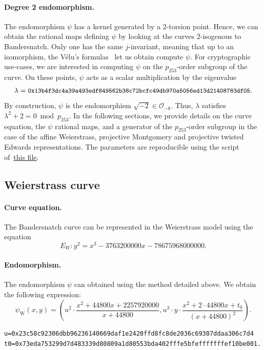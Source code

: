 \documentclass{article}
\theoremstyle{definition}
\begin{document}
\paragraph{Degree 2 endomorphism.}
The endomorphism $\psi$ has a kernel generated by a $2$-torsion
point. Hence, we can obtain the rational maps defining $\psi$ by
looking at the curves $2$-isogenous to Bandersnatch. Only one has the
same $j$-invariant, meaning that up to an isomorphism, the Vélu's
formulas~\cite{velu71} let us obtain compute $\psi$.
For cryptographic use-cases, we are interested in computing $\psi$ on
the $p_{253}$-order subgroup of the curve. On these points, $\psi$
acts as a scalar multiplication by the eigenvalue
$$\lambda = \text{\small{\tt
    0x13b4f3dc4a39a493edf849562b38c72bcfc49db970a5056ed13d21408783df05}}.$$
By construction, $\psi$ is the endomorphism $\sqrt{-2}\in \mathcal
O_{-8}$. Thus, $\lambda$ satisfies
$\lambda^2+2 = 0 \bmod p_{253}$.
In the following sections, we provide details on the curve equation,
the $\psi$ rational maps, and a generator of the $p_{253}$-order
subgroup in the case of the affine Weierstrass, projective Montgomery
and projective twisted Edwards representations.
The parameters are reproducible using the script
of~\href{https://github.com/asanso/Bandersnatch/blob/main/python-ref-impl/get\_params.py}{this
  file}.

\subsection{Weierstrass curve}\label{sec-w-curve}
\paragraph{Curve equation.}
The Bandersnatch curve can be represented in the Weierstrass model
using the equation
$$E_W:y^2 = x^3 -3763200000x -78675968000000.$$

\paragraph{Endomorphism.}
The endomorphism $\psi$ can obtained using the method detailed above.
We obtain the following expression:
$$\psi_\text{W}(x,y) = \left(u^2\cdot \frac{x^2+44800x+2257920000}{x+44800}, u^3\cdot
y\cdot \frac{x^2+2\cdot 44800x+t_0}{(x+44800)^2}\right).$$
\begin{verbatim}
u=0x23c58c92306dbb96236140669daf1e2420ffd8fc8de2036c69307ddaa306c7d4
t0=0x73eda753299d7d483339d80809a1d80553bda402fffe5bfefffffffef10be001.
\end{verbatim}
\end{document}
